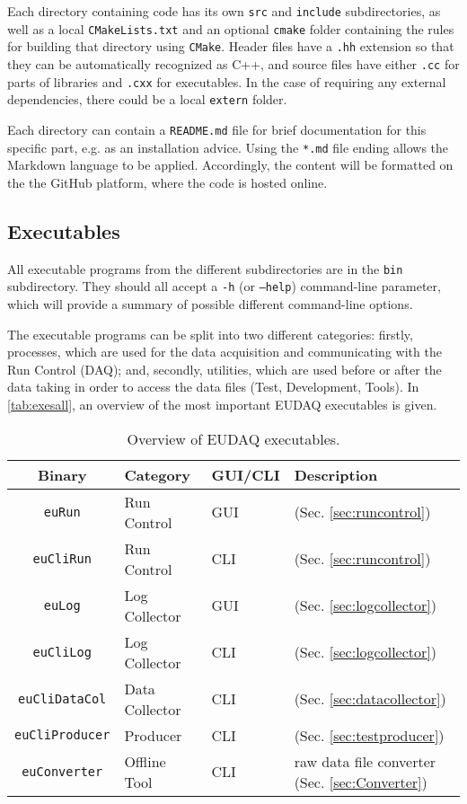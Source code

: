 Each directory containing code has its own \texttt{src} and \texttt{include} subdirectories,
as well as a local \texttt{CMakeLists.txt} and an optional \texttt{cmake} folder containing the rules
for building that directory using \texttt{CMake}.
Header files have a \texttt{.hh} extension so that they can be automatically recognized as C++,
and source files have either \texttt{.cc} for parts of libraries and \texttt{.cxx} for executables.
In the case of requiring any external dependencies, there could be a local \texttt{extern} folder.

Each directory can contain a \texttt{README.md} file for brief documentation for this specific part, e.g.  
as an installation advice. 
Using the \texttt{*.md} file ending allows the Markdown language \cite{markdownWWW} to be applied. 
Accordingly, the content will be formatted on the the GitHub platform, where the code is hosted online.

\subsection{Executables}
All executable programs from the different subdirectories are in the \texttt{bin} subdirectory. They should all accept a \texttt{-h} (or \texttt{--help}) command-line parameter, which will provide a summary of possible different command-line options.

The executable programs can be split into two different categories: firstly, processes, which are used for the data acquisition and communicating with the Run Control (DAQ); and, secondly, utilities, which are used before or after the data taking in order to access the data files (Test, Development, Tools).
In \autoref{tab:exesall}, an overview of the most important EUDAQ executables is given.

\begin{table}
\centering
\small
\begin{tabular}{ c | l | l | p{4cm}}
  \textbf{Binary} & \textbf{Category} & \textbf{GUI/CLI}  & \textbf{Description}\\
  \hline
  \hline
  \texttt{euRun} & Run Control & GUI & (Sec. \ref{sec:runcontrol}) \\
  \texttt{euCliRun} & Run Control & CLI & (Sec. \ref{sec:runcontrol}) \\
  \texttt{euLog} & Log Collector & GUI & (Sec. \ref{sec:logcollector}) \\
  \texttt{euCliLog} & Log Collector & CLI & (Sec. \ref{sec:logcollector}) \\
  \texttt{euCliDataCol} & Data Collector & CLI & (Sec. \ref{sec:datacollector}) \\
  \texttt{euCliProducer} & Producer & CLI & (Sec. \ref{sec:testproducer}) \\
  \hline
  \texttt{euConverter} & Offline Tool & CLI & raw data file converter (Sec. \ref{sec:Converter}) \\
\end{tabular}
\caption{Overview of EUDAQ executables.}
\label{tab:exesall}
\end{table}


